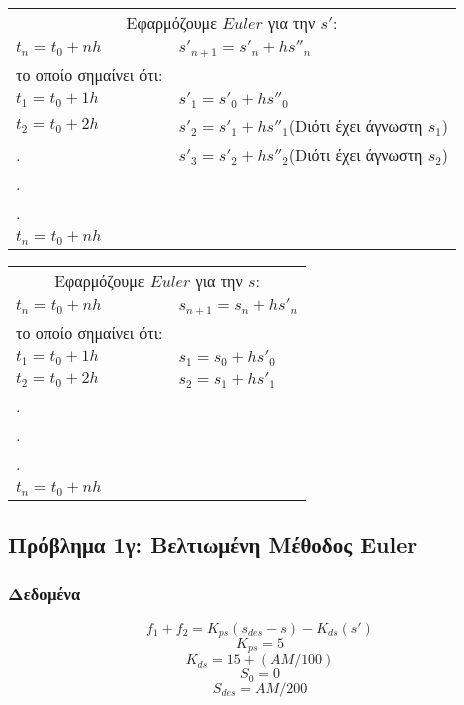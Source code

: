 \documentclass[a4paper]{article}
\begin{document}
        
        \begin{tabular}{l|l}
            \multicolumn{2}{c}{Εφαρμόζουμε $Euler$ για την $s'$: }\\
            $t_n=t_0+nh$ & $s'_{n+1}=s'_n+hs''_n$\\
            το οποίο σημαίνει ότι: & \\
            $t_1=t_0+1h$ & $s'_1=s'_0+hs''_0$\\
            $t_2=t_0+2h$ & $s'_2=s'_1+hs''_1$(Dιότι έχει άγνωστη $s_1$)\\
            .            & $s'_3=s'_2+hs''_2$(Dιότι έχει άγνωστη $s_2$)\\
            . & \\
            . & \\
            $t_n=t_0+nh$ & \\
        \end{tabular} 
        
        \begin{tabular}{l|l}
            \multicolumn{2}{c}{Εφαρμόζουμε $Euler$ για την $s$: }\\
            $t_n=t_0+nh$ & $s_{n+1}=s_n+hs'_n$\\
            το οποίο σημαίνει ότι: & \\
            $t_1=t_0+1h$ & $s_1=s_0+hs'_0$\\
            $t_2=t_0+2h$ & $s_2=s_1+hs'_1$\\
            .            &\\
            . & \\
            . & \\
            $t_n=t_0+nh$ & \\
        \end{tabular}



        \subsection{Πρόβλημα 1γ: Βελτιωμένη Μέθοδος Euler}

        \subsubsection{Δεδομένα}

        \[f_1 + f_2 = K_{ps}(s_{des} - s) - K_{ds}(s')\]
        \[K_{ps} = 5\]
        \[K_{ds} = 15 + (AM/ 100)\]
        \[S_0 =0\]
        \[S_{des} = AM / 200\]
\end{document}

